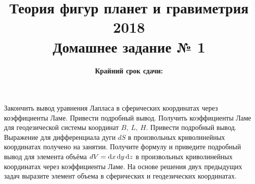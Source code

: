 \documentclass[11pt, a4paper,addpoints]{exam}
\title{{\Large Теория фигур планет и гравиметрия 2018}\\ 
    {\bf\Large Домашнее задание № 1}}
\author{}
\date{\normalsize\bf Крайний срок сдачи: \DTMusedate{deadline}}
\theoremstyle{remark}
\begin{document}
\maketitle
\thispagestyle{empty}
\begin{questions}
    \question[3] Закончить вывод уравнения Лапласа в сферических координатах через коэффициенты Ламе.
    Привести подробный вывод.
    \question[1] Получить коэффициенты Ламе для геодезической системы координат $B,\ L,\ H$. Привести
    подробный вывод.
    \question[1] Выражение для дифференциала дуги $dS$ в произвольных криволинейных координатах получено на
    занятии. Получите формулу и приведите подробный вывод для элемента объёма $dV = \dif x\dif y\dif z$
    в произвольных криволинейных координатах через коэффициенты Ламе. 
    На основе решения двух предыдущих задач выразите элемент объема в сферических и геодезических координатах.
\end{questions}
\end{document}
